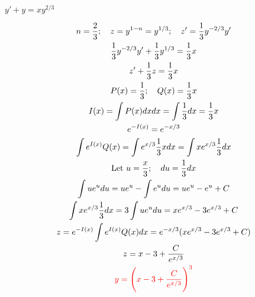 \item [1.] $y' + y = xy^{2/3}$

\textcolor{blue}{
    \begin{gather*}
        n = \frac{2}{3}; \quad z=y^{1-n}=y^{1/3};\quad z' = \frac{1}{3}y^{-2/3}y'\\
        \frac{1}{3}y^{-2/3}y' + \frac{1}{3}y^{1/3} = \frac{1}{3}x\\
        z'+\frac{1}{3}z=\frac{1}{3}x\\
        P(x)=\frac{1}{3}; \quad Q(x)=\frac{1}{3}x\\
        I(x)=\int P(x)dx dx= \int \frac{1}{3}dx=\frac{1}{3}x\\
        e^{-I(x)}=e^{-x/3}\\
        \int e^{I(x)}Q(x)=\int e^{x/3}\frac{1}{3}xdx=\int xe^{x/3}\frac{1}{3}dx\\
        \text{Let } u=\frac{x}{3};\quad du=\frac{1}{3}dx\\
        \int ue^udu = ue^u-\int e^udu = ue^u-e^u+C\\
        \int xe^{x/3}\frac{1}{3}dx=3\int ue^udu=xe^{x/3}-3e^{x/3}+C\\
        z=e^{-I(x)}\int e^{I(x)}Q(x) dx=e^{-x/3}(xe^{x/3}-3e^{x/3}+C)\\
        z=x-3+\frac{C}{e^{x/3}}\\
        \textcolor{red}{
        y=\Bigg(x-3+\frac{C}{e^{x/3}}\Bigg)^3
        }
    \end{gather*}
}